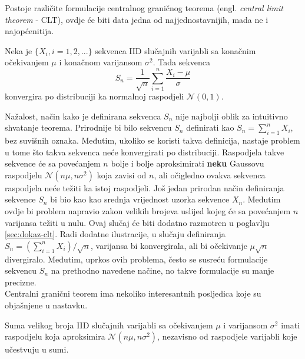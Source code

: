 Postoje različite formulacije centralnog graničnog teorema (engl.
\textit{central limit theorem} - CLT), ovdje će biti data jedna od
najjednostavnijih, mada ne i najopćenitija.
\begin{theorem} \label{th:clt}
  Neka je $\{X_i, i=1,2,...\}$ sekvenca IID slučajnih varijabli sa
  konačnim očekivanjem $\mu$ i konačnom varijansom $\sigma^2$. Tada
  sekvenca
  \begin{equation}
    S_n = \frac{1}{\sqrt{n}} \sum_{i=1}^{n} \frac{X_i-\mu}{\sigma}
  \end{equation}
  konvergira po distribuciji ka normalnoj raspodjeli $\mathcal{N}(0, 1)$.
\end{theorem}

Nažalost, način kako je definirana sekvenca $S_n$ nije najbolji oblik za
intuitivno shvatanje teorema. Prirodnije bi bilo sekvencu $S_n$ definirati kao
$S_n=\sum_{i=1}^{n} X_i$, bez suvišnih oznaka. Međutim, ukoliko se koristi takva
definicija, nastaje problem u tome što takva sekvenca neće konvergirati po
distribuciji. Raspodjela takve sekvence će sa povećanjem $n$ bolje i bolje
aproksimirati \textbf{neku} Gaussovu raspodjelu $\mathcal{N}(n\mu,n\sigma^2)$
koja zavisi od $n$, ali očigledno ovakva sekvenca raspodjela neće težiti ka
istoj raspodjeli. Još jedan prirodan način definiranja sekvence $S_n$ bi bio kao
kao srednja vrijednost uzorka sekvence $X_n$. Međutim ovdje bi problem napravio
zakon velikih brojeva uslijed kojeg će sa povećanjem $n$ varijansa težiti u
nulu. Ovaj slučaj će biti dodatno razmotren u poglavlju \ref{sec:dokaz-clt}.
Radi dodatne ilustracije, u slučaju definiranja $S_n = \left(\sum_{i=1}^n
X_i\right)/\sqrt{n}$, varijansa bi konvergirala, ali bi očekivanje $\mu
\sqrt{n}$ divergiralo.  Međutim, uprkos ovih problema, često se susreću
formulacije  sekvencu $S_n$ na prethodno navedene načine, no takve formulacije
su manje precizne. \\

Centralni granični teorem ima nekoliko interesantnih posljedica koje su
objašnjene u nastavku.

\setcounter{corollary}{0}
\begin{corollary}

  Suma velikog broja IID slučajnih varijabli sa očekivanjem $\mu$ i varijansom
  $\sigma^2$ imati raspodjelu koja aproksimira $\mathcal{N}(n\mu, n\sigma^2)$,
  nezavisno od raspodjele varijabli koje učestvuju u sumi. 

\end{corollary}

